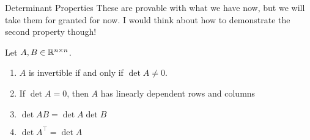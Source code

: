 \documentclass[xcoler=dvipsnames, aspectratio=169]{beamer}
\begin{document}
    \begin{frame}{Determinant Properties}
        These are provable with what we have now, but we will take them for granted for now.
        I would think about how to demonstrate the second property though!

        Let $A,B\in\mathbb{R}^{n\times n}$.
        \begin{enumerate}
            \pause\item $A$ is invertible if and only if $\det{A} \neq 0$.
            \pause\item If $\det{A}=0$, then $A$ has linearly dependent rows and columns
            \pause\item $\det{AB} = \det{A}\det{B}$
            \pause\item $\det{A^\top}=\det{A}$
        \end{enumerate}
    \end{frame}
\end{document}
